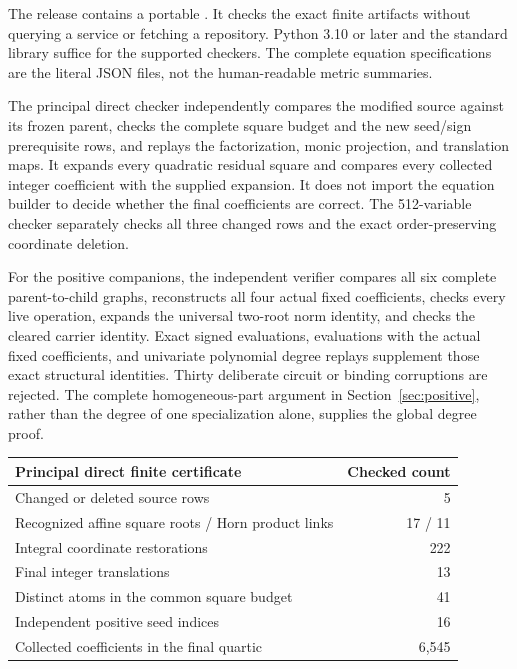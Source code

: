 The release contains a portable . It checks the exact
finite artifacts without querying a service or fetching a repository. Python
3.10 or later and the standard library suffice for the supported checkers.
The complete equation specifications are the literal JSON files, not the
human-readable metric summaries.

The principal direct checker independently compares the modified source
against its frozen parent, checks the complete square budget and the new
seed/sign prerequisite rows, and replays the factorization, monic projection,
and translation maps. It expands every quadratic residual square and compares
every collected integer coefficient with the supplied expansion. It does
not import the equation builder to decide whether the final coefficients are
correct. The 512-variable checker separately checks all three changed rows
and the exact order-preserving coordinate deletion.

For the positive companions, the independent verifier compares all six
complete parent-to-child graphs, reconstructs all four actual fixed
coefficients, checks every live operation, expands the universal two-root
norm identity, and checks the cleared carrier identity. Exact signed
evaluations, evaluations with the actual fixed coefficients, and univariate
polynomial degree replays supplement those exact structural identities.
Thirty deliberate circuit or binding corruptions are rejected. The complete
homogeneous-part argument in Section~\ref{sec:positive}, rather than the
degree of one specialization alone, supplies the global degree proof.

\begin{center}
\begin{tabular}{lr}
\toprule
Principal direct finite certificate & Checked count\\
\midrule
Changed or deleted source rows & 5\\
Recognized affine square roots / Horn product links & 17 / 11\\
Integral coordinate restorations & 222\\
Final integer translations & 13\\
Distinct atoms in the common square budget & 41\\
Independent positive seed indices & 16\\
Collected coefficients in the final quartic & 6,545\\
\bottomrule
\end{tabular}
\end{center}

